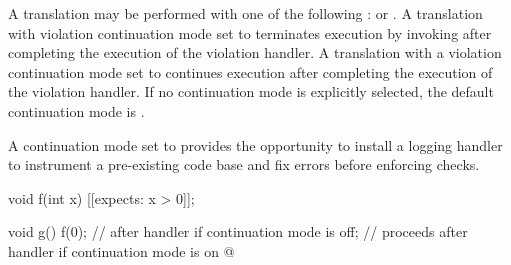 \pnum
A translation may be performed with one of the following
:
 or .
A translation with violation continuation mode set to 
terminates execution
by invoking 
after completing the execution of the violation handler.
A translation with a violation continuation mode set to 
continues execution after completing the execution of the violation handler.
If no continuation mode is explicitly selected,
the default continuation mode is .
\begin{note}
A continuation mode set to  provides the opportunity
to install a logging handler to instrument a pre-existing code base
and fix errors before enforcing checks.
\end{note}
\begin{example}
\begin{codeblock}
void f(int x) [[expects: x > 0]];

void g() {
  f(0);         //  after handler if continuation mode is off;
                // proceeds after handler if continuation mode is on
  @\commentellip@
}
\end{codeblock}
\end{example}

